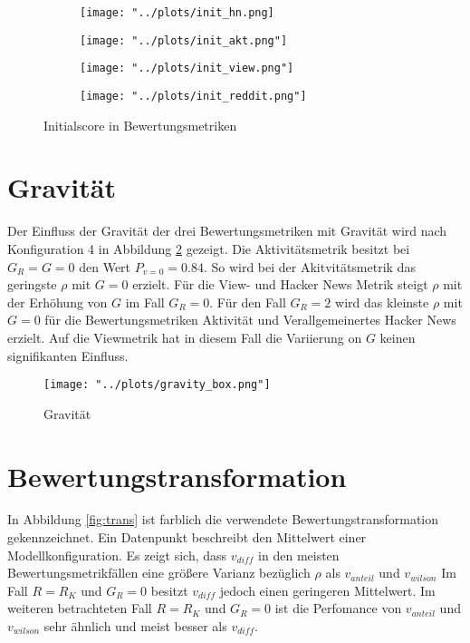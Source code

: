 \begin{figure}[!htb]
	\begin{subfigure}{0.5\textwidth}
		\texttt{[image: "../plots/init\_hn.png]}%
	\end{subfigure}
	\hfill
	\begin{subfigure}{0.5\textwidth}
		
		
		\texttt{[image: "../plots/init\_akt.png"]}%

	\end{subfigure}
	\begin{subfigure}{0.5\textwidth}
		\texttt{[image: "../plots/init\_view.png"]}%
	\end{subfigure}
	\hfill
	\begin{subfigure}{0.5\textwidth}
		\texttt{[image: "../plots/init\_reddit.png"]}%
	\end{subfigure}
	\caption{Initialscore in Bewertungsmetriken}
	\label{fig:init_scoring_functions}
\end{figure}


\section{Gravität}

Der Einfluss der Gravität der drei Bewertungsmetriken mit Gravität wird nach Konfiguration 4 in Abbildung \ref{fig:grav} gezeigt. Die Aktivitätsmetrik besitzt bei $G_R = G=0$ den Wert $P_{v=0} = 0.84$. So wird bei der Akitvitätsmetrik das geringste $\rho$ mit $G=0$ erzielt. Für die View- und Hacker News Metrik steigt $\rho$ mit der Erhöhung von $G$ im Fall $G_R = 0$. Für den Fall $G_R = 2$ wird das kleinste $\rho$ mit $G = 0$ für die Bewertungsmetriken Aktivität und Verallgemeinertes Hacker News erzielt. Auf die Viewmetrik hat in diesem Fall die Variierung on $G$ keinen signifikanten Einfluss.

\begin{figure}[!h]
	\label{fig:grav}	
	\texttt{[image: "../plots/gravity\_box.png"]}
	\caption{Gravität}
\end{figure}

\section{Bewertungstransformation}

In Abbildung \ref{fig:trans} ist farblich die verwendete Bewertungstransformation gekennzeichnet. Ein Datenpunkt beschreibt den Mittelwert einer Modellkonfiguration. Es zeigt sich, dass $v_{diff}$ in den meisten Bewertungsmetrikfällen eine größere Varianz bezüglich $\rho$ als $v_{anteil}$ und $v_{wilson}$ Im Fall $R = R_K$ und $G_R = 0$ besitzt $v_{diff}$ jedoch einen geringeren Mittelwert. Im weiteren betrachteten Fall $R = R_K$ und $G_R = 0$ ist die Perfomance von $v_{anteil}$ und $v_{wilson}$ sehr ähnlich und meist besser als $v_{diff}$.  

